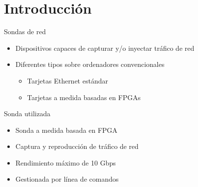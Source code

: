 \section{Introducción}

\begin{frame}{Sondas de red}
  \begin{itemize}
    \item\alert<+>{Dispositivos capaces de capturar y/o inyectar tráfico de red}
    \item\alert<+>{Diferentes tipos sobre ordenadores convencionales}
    \begin{itemize}
      \item Tarjetas Ethernet estándar
      \item Tarjetas a medida basadas en FPGAs
    \end{itemize}
  \end{itemize}
\end{frame}

\begin{frame}{Sonda utilizada}
  \begin{itemize}[<alert@+>]
    \item Sonda a medida basada en FPGA
    \item Captura y reproducción de tráfico de red
    \item Rendimiento máximo de 10 Gbps
    \item Gestionada por línea de comandos
  \end{itemize}
\end{frame}
